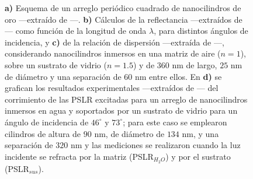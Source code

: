 \begin{figure}[h!]
		\caption{\textbf{a)} Esquema de  un arreglo periódico cuadrado de nanocilindros de oro ---extraído de  \cite{kabashin2009plasmonic}---. \textbf{b)} Cálculos de la reflectancia ---extraídos de  \cite{kabashin2009plasmonic}--- como función de la longitud de onda $\lambda$, para distintos ángulos de incidencia, y \textbf{c)} de la relación de dispersión ---extraída de  \cite{kabashin2009plasmonic}---, considerando nanocilindros inmersos en una matriz de aire ($n=1$), sobre un sustrato de vidrio ($n=1.5$) y de $360$ nm de largo, $25$ nm de diámetro y una separación de $60$ nm entre ellos. En \textbf{d)} se grafican los resultados experimentales ---extraídos de  \cite{danilov2018ultra}--- del corrimiento de las PSLR excitadas para un arreglo de nanocilindros inmersos en agua y soportados por un sustrato de vidrio para un ángulo de incidencia de $46^\circ$ y $73^\circ$; para este caso se emplearon cilindros de altura de $90$ nm, de diámetro de $134$ nm, y una separación de $320$ nm y las mediciones se realizaron cuando la luz incidente se refracta por la matriz (PSLR$_{H_2{O}}$) y por el sustrato (PSLR$_{sus}$).}\label{fig:GraphsPapersNANOCILINDROS}
	\end{figure}

